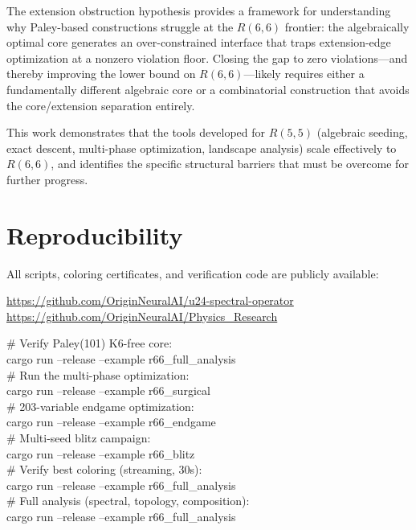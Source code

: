 \documentclass[11pt,a4paper]{article}
\theoremstyle{plain}
\theoremstyle{remark}
\begin{document}
The extension obstruction hypothesis provides a framework for
understanding why Paley-based constructions struggle at the $R(6,6)$
frontier: the algebraically optimal core generates an over-constrained
interface that traps extension-edge optimization at a nonzero
violation floor. Closing the gap to zero violations---and thereby
improving the lower bound on $R(6,6)$---likely requires either a
fundamentally different algebraic core or a combinatorial construction
that avoids the core/extension separation entirely.

This work demonstrates that the tools developed for $R(5,5)$
(algebraic seeding, exact descent, multi-phase optimization, landscape
analysis) scale effectively to $R(6,6)$, and identifies the specific
structural barriers that must be overcome for further progress.

\section{Reproducibility}
\label{sec:repro}

All scripts, coloring certificates, and verification code are publicly
available:

\begin{center}
\url{https://github.com/OriginNeuralAI/u24-spectral-operator}\\
\url{https://github.com/OriginNeuralAI/Physics_Research}
\end{center}

\begin{tcolorbox}[colback=reedsbg, colframe=accent!50, fontupper=\small\ttfamily,
  title={\small\bfseries Reproduction Commands}, coltitle=white,
  colbacktitle=accent]
\# Verify Paley(101) K6-free core:\\
cargo run --release --example r66\_full\_analysis\\[4pt]
\# Run the multi-phase optimization:\\
cargo run --release --example r66\_surgical\\[4pt]
\# 203-variable endgame optimization:\\
cargo run --release --example r66\_endgame\\[4pt]
\# Multi-seed blitz campaign:\\
cargo run --release --example r66\_blitz\\[4pt]
\# Verify best coloring (streaming, 30s):\\
cargo run --release --example r66\_full\_analysis\\[4pt]
\# Full analysis (spectral, topology, composition):\\
cargo run --release --example r66\_full\_analysis
\end{tcolorbox}
\end{document}
